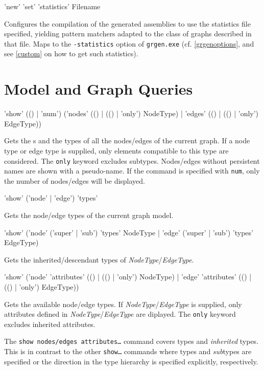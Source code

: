 \begin{rail}
  'new' 'set' 'statistics' Filename
\end{rail}
Configures the compilation of the generated assemblies to use the statistics file specified, yielding pattern matchers adapted to the class of graphs described in that file.
Maps to the \texttt{-statistics} option of \texttt{grgen.exe} (cf. \ref{grgenoptions}, and see \ref{custom} on how to get such statistics).


\section{Model and Graph Queries}

\begin{rail}
  'show' (() | 'num') ('nodes' (() | (() | 'only') NodeType) | 'edges' (() | (() | 'only') EdgeType))
\end{rail}
Gets the s and the types of all the nodes/edges of the current graph.
If a node type or edge type is supplied, only elements compatible to this type are considered.
The \texttt{only} keyword excludes subtypes. Nodes/edges without persistent names are shown with a pseudo-name.
If the command is specified with \texttt{num}, only the number of nodes/edges will be displayed.

\begin{rail}
  'show' ('node' | 'edge') 'types'
\end{rail}
Gets the node/edge types of the current graph model.

\begin{rail}
'show' ('node' ('super' | 'sub') 'types' NodeType | 'edge' ('super' | 'sub') 'types' EdgeType)
\end{rail}
Gets the inherited/descendant types of \emph{NodeType}/\emph{EdgeType}.

\begin{rail}
  'show' ('node' 'attributes' (() | (() | 'only') NodeType) | 'edge' 'attributes' (() | (() | 'only') EdgeType))
\end{rail}
Gets the available node/edge  types.
If \emph{NodeType}/\emph{EdgeType} is supplied, only attributes defined in \emph{NodeType}/\emph{EdgeType} are diplayed.
The \texttt{only} keyword excludes inherited attributes.\\
\begin{warning}
The \texttt{show nodes/edges attributes\dots} command covers types and \emph{inherited} types.
This is in contrast to the other \texttt{show\dots} commands where types and \emph{sub}types are specified or the direction in the type hierarchy is specified explicitly, respectively.
\end{warning}

